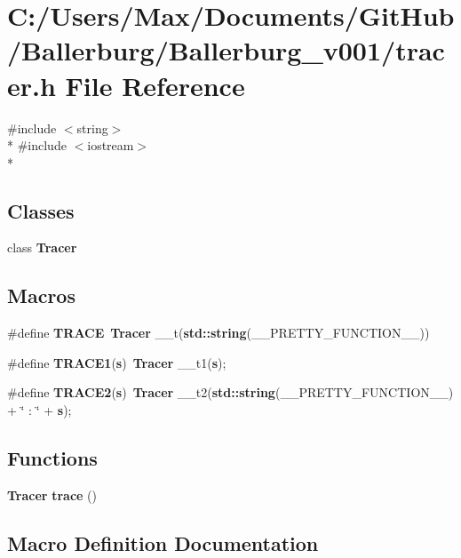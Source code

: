\section{C\+:/\+Users/\+Max/\+Documents/\+Git\+Hub/\+Ballerburg/\+Ballerburg\+\_\+v001/tracer.h File Reference}
\label{tracer_8h}
{\ttfamily \#include $<$string$>$}\\*
{\ttfamily \#include $<$iostream$>$}\\*
\subsection*{Classes}
\begin{DoxyCompactItemize}
\item 
class {\bf Tracer}
\end{DoxyCompactItemize}
\subsection*{Macros}
\begin{DoxyCompactItemize}
\item 
\#define {\bf T\+R\+A\+C\+E}~{\bf Tracer} \+\_\+\+\_\+t({\bf std\+::string}(\+\_\+\+\_\+\+P\+R\+E\+T\+T\+Y\+\_\+\+F\+U\+N\+C\+T\+I\+O\+N\+\_\+\+\_\+))
\item 
\#define {\bf T\+R\+A\+C\+E1}({\bf s})~{\bf Tracer} \+\_\+\+\_\+t1({\bf s});
\item 
\#define {\bf T\+R\+A\+C\+E2}({\bf s})~{\bf Tracer} \+\_\+\+\_\+t2({\bf std\+::string}(\+\_\+\+\_\+\+P\+R\+E\+T\+T\+Y\+\_\+\+F\+U\+N\+C\+T\+I\+O\+N\+\_\+\+\_\+) + \char`\"{} \+: \char`\"{} + {\bf s});
\end{DoxyCompactItemize}
\subsection*{Functions}
\begin{DoxyCompactItemize}
\item 
{\bf Tracer} {\bf trace} ()
\end{DoxyCompactItemize}


\subsection{Macro Definition Documentation}
